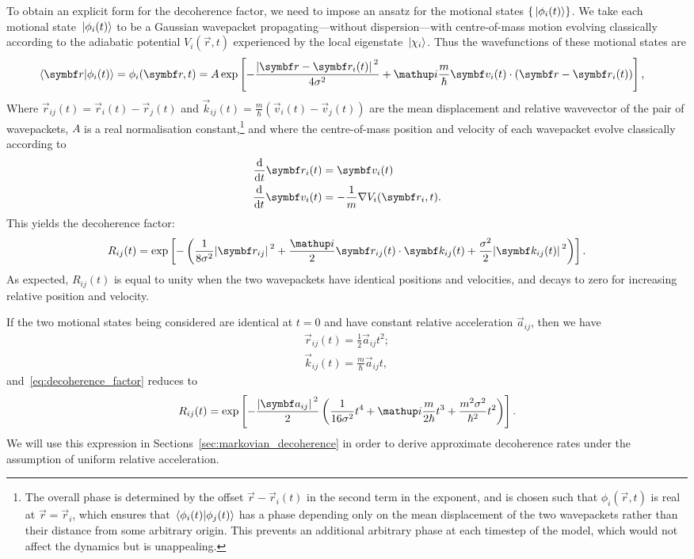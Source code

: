 To obtain an explicit form for the decoherence factor, we need to impose an ansatz for the motional states $\{\ket{\phi_i(t)}\}$. We take each motional state $\ket{\phi_i(t)}$ to be a Gaussian wavepacket propagating---without dispersion---with centre-of-mass motion evolving classically according to the adiabatic potential $V_i(\vec r, t)$ experienced by the local eigenstate $\ket{\chi_i}$. Thus the wavefunctions of these motional states are
\begin{align}
\braket{\vec r}{\phi_i(t)} &= \phi_i(\vec r, t) = A\exp\left[-\frac{\abs{\vec r - \vec r_i(t)}^2}{4\sigma^2} + \ii \frac m\hbar \vec v_i(t)\cdot (\vec r - \vec r_i(t))\right],
\end{align}
Where $\vec r_{ij}(t) = \vec r_i(t) - \vec r_j(t)$ and $\vec k_{ij}(t) = \frac m\hbar \left(\vec v_i(t) - \vec v_j(t)\right)$ are the mean displacement and relative wavevector of the pair of wavepackets, $A$ is a real normalisation constant,\footnote{The overall phase is determined by the offset $\vec r - \vec r_i(t)$ in the second term in the exponent, and is chosen such that $\phi_i(\vec r, t)$ is real at $\vec r=\vec r_i$, which ensures that $\braket{\phi_i(t)}{\phi_j(t)}$ has a phase depending only on the mean displacement of the two wavepackets rather than their distance from some arbitrary origin. This prevents an additional arbitrary phase at each timestep of the model, which would not affect the dynamics but is unappealing.} and where the centre-of-mass position and velocity of each wavepacket evolve classically according to
\begin{align}\label{eq:classical_const_a_first}
\dv{t} \vec r_i(t) &= \vec v_i(t)\\
\dv{t} \vec v_i(t) &= -\frac1m\nabla V_i(\vec r_i, t).
\label{eq:classical_const_a_second}
\end{align}
This yields the decoherence factor:
\begin{align}\label{eq:decoherence_factor}
R_{ij}(t) = \exp\left[-\left(\frac1{8\sigma^2}\abs{\vec r_{ij}}^2
+ \frac\ii 2 \vec r_{ij}(t) \cdot \vec k_{ij}(t) + \frac{\sigma^2}{2} \abs{\vec k_{ij}(t)}^2
\right)\right].
\end{align}
As expected, $R_{ij}(t)$ is equal to unity when the two wavepackets have identical positions and velocities, and decays to zero for increasing relative position and velocity. 

If the two motional states being considered are identical at $t=0$ and have constant relative acceleration $\vec a_{ij}$, then we have
\begin{align}
\vec r_{ij}(t) = \frac12\vec a_{ij} t^2;\\
\vec k_{ij}(t) = \frac m \hbar \vec a_{ij} t,
\end{align}
and~\eqref{eq:decoherence_factor} reduces to
\begin{align}\label{eq:const_a_decoherence_factor}
R_{ij}(t) = \exp\left[-\frac {\abs{\vec a_{ij}}^2} 2 \left(\frac1 {16\sigma^2}t^4 + \ii\frac m{2\hbar}t^3 + \frac{m^2\sigma^2}{\hbar^2} t^2 \right)\right].
\end{align}
We will use this expression in Sections~\ref{sec:markovian_decoherence} in order to derive approximate decoherence rates under the assumption of uniform relative acceleration.

